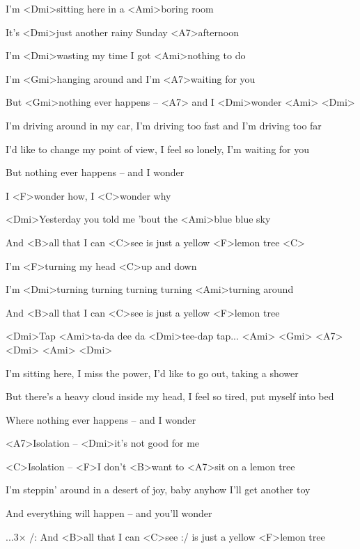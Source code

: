 

\zs
I'm <Dmi>sitting here in a <Ami>boring room

It's <Dmi>just another rainy Sunday <A7>afternoon

I'm <Dmi>wasting my time I got <Ami>nothing to do

I'm <Gmi>hanging around and I'm <A7>waiting for you

But <Gmi>nothing ever happens -- <A7> and I <Dmi>wonder <Ami> <Dmi>
\ks

\zs
I'm driving around in my car, I'm driving too fast and I'm driving too far

I'd like to change my point of view, I feel so lonely, I'm waiting for you

But nothing ever happens -- and I wonder
\ks

\zr
I <F>wonder how, I <C>wonder why

<Dmi>Yesterday you told me 'bout the <Ami>blue blue sky

And <B>all that I can <C>see is just a yellow <F>lemon tree <C>

I'm <F>turning my head <C>up and down

I'm <Dmi>turning turning turning turning <Ami>turning around

And <B>all that I can <C>see is just a yellow <F>lemon tree
\kr

\zs
<Dmi>Tap <Ami>ta-da dee da <Dmi>tee-dap tap... <Ami> <Gmi>
<A7> <Dmi> <Ami> <Dmi>
\ks

\zs
I'm sitting here, I miss the power, I'd like to go out, taking a shower

But there's a heavy cloud inside my head, I feel so tired, put myself into bed

Where nothing ever happens -- and I wonder
\ks

<A7>Isolation -- <Dmi>it's not good for me

<C>Isolation -- <F>I don't <B>want to <A7>sit on a lemon tree

\zs
I'm steppin' around in a desert of joy, baby anyhow I'll get another toy

And everything will happen -- and you'll wonder
\ks

\zr\kr

...3× /: And <B>all that I can <C>see :/
is just a yellow <F>lemon tree

\kp
